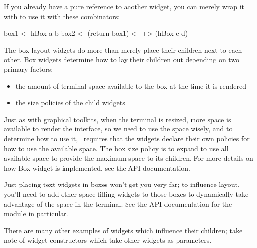 If you already have a pure reference to another widget, you can merely
wrap it with  to use it with these combinators:

\begin{haskellcode}
 box1 <- hBox a b
 box2 <- (return box1) <++> (hBox c d)
\end{haskellcode}

The box layout widgets do more than merely place their children next to
each other.  Box widgets determine how to lay their children out
depending on two primary factors:

\begin{itemize}
\item the amount of terminal space available to the box at the time it
      is rendered
\item the size policies of the child widgets
\end{itemize}

Just as with graphical toolkits, when the terminal is resized, more
space is available to render the interface, so we need to use the
space wisely, and to determine how to use it, \vtyui\ requires that
the widgets declare their own policies for how to use the available
space.  The box size policy is to expand to use all available space to
provide the maximum space to its children.  For more details on how
Box widget is implemented, see the API documentation.

Just placing text widgets in boxes won't get you very far; to
influence layout, you'll need to add other space-filling widgets to
those boxes to dynamically take advantage of the space in the
terminal.  See the API documentation for the  module in
particular.

There are many other examples of widgets which influence their children;
take note of widget constructors which take other widgets as parameters.
